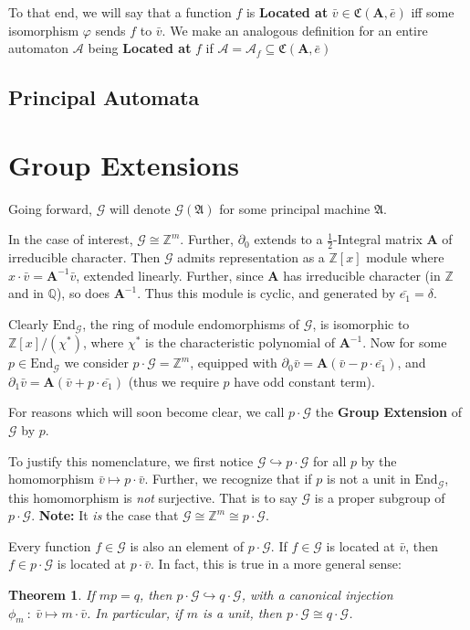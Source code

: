 \documentclass[12pt]{article}
\newcommand{\A}{\mathcal{A}}
\newcommand{\G}{\mathcal{G}}
\renewcommand{\P}{\mathfrak{A}}
\newcommand{\Z}{\mathbb{Z}}
\newcommand{\Q}{\mathbb{Q}}
\newcommand{\2}{\textbf{2}}
\newcommand{\Am}{\textbf{A}}
\newcommand{\del}{\partial}
\renewcommand{\v}{\bar{v}}
\newtheorem{thm}{Theorem}
\begin{document}
To that end, we will say that a function $f$ is \textbf{Located at} 
$\v \in \mathfrak{C}(\Am, \bar{e})$ iff some isomorphism $\varphi$ sends 
$f$ to $\v$. We make an analogous definition for an entire automaton $\A$
being \textbf{Located at} $f$ if 
$\A = \A_f \subseteq \mathfrak{C}(\Am, \bar{e})$

\subsection{Principal Automata}

\section{Group Extensions}
Going forward, $\G$ will denote $\G(\P)$ for some principal machine $\P$.

In the case of interest, $\G \cong \Z^m$. Further, $\del_0$ extends to 
a $\frac{1}{2}$-Integral matrix $\Am$ of irreducible character. Then
$\G$ admits representation as a $\Z[x]$ module where 
$x \cdot \v = \Am^{-1}\v$, extended linearly.
Further, since $\Am$ has irreducible character (in $\Z$ and in $\Q$), 
so does $\Am^{-1}$. Thus this module is cyclic, 
and generated by $\bar{e_1} = \delta$.

Clearly $\text{End}_{\G}$, the ring of module endomorphisms of $\G$, 
is isomorphic to $\Z[x]/(\chi^*)$, 
where $\chi^*$ is the characteristic polynomial of $\Am^{-1}$.
Now for some $p \in \text{End}_{\G}$ we consider
$p \cdot \G = \Z^m$, equipped with
$\del_0 \v = \Am (\v - p \cdot \bar{e_1})$, and 
$\del_1 \v = \Am (\v + p \cdot \bar{e_1})$
(thus we require $p$ have odd constant term).

For reasons which will soon become clear, we call $p \cdot \G$ the
\textbf{Group Extension} of $\G$ by $p$.

To justify this nomenclature, we first notice 
$\G \hookrightarrow p \cdot \G$ for all $p$ by the
homomorphism $\v \mapsto p \cdot \v$. 
Further, we recognize that if $p$ is not a unit in $\text{End}_{\G}$, 
this homomorphism is \emph{not} surjective. 
That is to say $\G$ is a proper subgroup of $p \cdot \G$.
\textbf{Note:} It \emph{is} the case that $\G \cong \Z^m \cong p \cdot \G$. 

Every function $f \in \G$ is also an element of $p \cdot \G$. 
If $f \in \G$ is located at $\v$, then $f \in p \cdot \G$ is located
at $p \cdot \v$. In fact, this is true in a more general sense:

\begin{thm}
  If $mp = q$, then $p \cdot \G \hookrightarrow q \cdot \G$, 
  with a canonical injection $\phi_m~:~\v \mapsto m \cdot \v$. 
  In particular, if $m$ is a unit, then $p \cdot \G \cong q \cdot \G$.
\end{thm}
\end{document}
